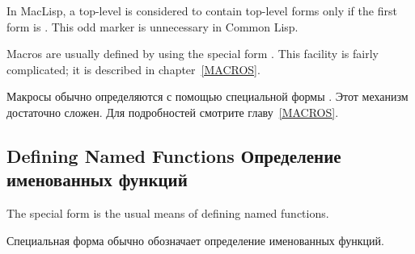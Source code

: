 \beforenoterule
\begin{incompatibility}
In MacLisp, a top-level  is considered to
contain top-level forms only if the first form is .
This odd marker is unnecessary in Common Lisp.
\end{incompatibility}
\afternoterule

Macros are usually defined by using the special form .
This facility is fairly complicated; it is described in chapter~\ref{MACROS}.

Макросы обычно определяются с помощью специальной формы .
Этот механизм достаточно сложен. Для подробностей смотрите главу~\ref{MACROS}.


\subsection{Defining Named Functions Определение именованных функций}

The  special form is the usual means of defining named functions.

Специальная форма  обычно обозначает определение именованных функций.

